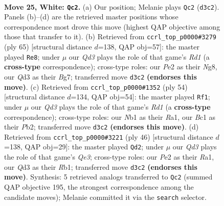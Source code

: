 \documentclass[11pt]{article}
\begin{document}
\clearpage

\begin{figure}[p]\centering
\begin{subfigure}{0.46\textwidth}\centering
\resizebox{\linewidth}{!}{%
\newchessgame
\chessboard[
  setfen={r1br2k1/p2nb2p/2p5/3q4/Pp1p1P2/1P1Q4/3NPK2/RNBR4 w - - 1 25},
  showmover=false,
  pgfstyle=straightmove, color=movearrow, markmove={d3-c2}
]}
\caption{}
\end{subfigure}\hfill
\begin{subfigure}{0.46\textwidth}\centering
\resizebox{\linewidth}{!}{%
\newchessgame
\chessboard[
  setfen={3r1nnk/p1r2qb1/1pp3pp/8/1P1PQP2/P1NB1R2/5B1P/6RK b - - 6 33},
  showmover=false,
  pgfstyle=straightmove, color=movearrow, markmove={d8-e8}
]}
\caption{}
\end{subfigure}
\\[4pt]
\begin{subfigure}{0.46\textwidth}\centering
\resizebox{\linewidth}{!}{%
\newchessgame
\chessboard[
  setfen={1r2r1k1/pp1q2bp/6p1/P2Pp3/2pnN3/2N3Q1/1P4PP/R2R3K w - - 3 28},
  showmover=false,
  pgfstyle=straightmove, color=movearrow, markmove={d1-f1}
]}
\caption{}
\end{subfigure}\hfill
\begin{subfigure}{0.46\textwidth}\centering
\resizebox{\linewidth}{!}{%
\newchessgame
\chessboard[
  setfen={1rbr2k1/3nqpp1/4p2p/4P3/1p1P4/4QN1P/4BPP1/RR4K1 w - - 7 24},
  showmover=false,
  pgfstyle=straightmove, color=movearrow, markmove={e3-d2}
]}
\caption{}
\end{subfigure}
\caption{\textbf{Move 25, White: \texttt{Qc2}.} (a) Our position; Melanie plays \texttt{Qc2} (\texttt{d3c2}). Panels (b)--(d) are the retrieved master positions whose correspondence most drove this move (highest QAP objective among those that transfer to it). (b) Retrieved from \texttt{ccrl\_top\_p0000\#3279} (ply 65) [structural distance $d$=138, QAP obj=57]: the master played \texttt{Re8}; under $\mu$ our \emph{Qd3} plays the role of that game's \emph{Rd1} (a \textbf{cross-type} correspondence); cross-type roles: our \emph{P}e2 as their \emph{N}g8, our \emph{Q}d3 as their \emph{B}g7; transferred move \texttt{d3c2} \textbf{(endorses this move)}. (c) Retrieved from \texttt{ccrl\_top\_p0000\#1352} (ply 54) [structural distance $d$=134, QAP obj=54]: the master played \texttt{Rf1}; under $\mu$ our \emph{Qd3} plays the role of that game's \emph{Rd1} (a \textbf{cross-type} correspondence); cross-type roles: our \emph{N}b1 as their \emph{R}a1, our \emph{B}c1 as their \emph{P}b2; transferred move \texttt{d3c2} \textbf{(endorses this move)}. (d) Retrieved from \texttt{ccrl\_top\_p0000\#3221} (ply 46) [structural distance $d$=138, QAP obj=29]: the master played \texttt{Qd2}; under $\mu$ our \emph{Qd3} plays the role of that game's \emph{Qe3}; cross-type roles: our \emph{P}e2 as their \emph{R}a1, our \emph{Q}d3 as their \emph{R}b1; transferred move \texttt{d3c2} \textbf{(endorses this move)}. Synthesis: 5 retrieved analogs transferred to \texttt{Qc2} (summed QAP objective 195, the strongest correspondence among the candidate moves); Melanie committed it via the \texttt{search} selector.}
\label{fig:thought-m48}
\end{figure}
\end{document}

